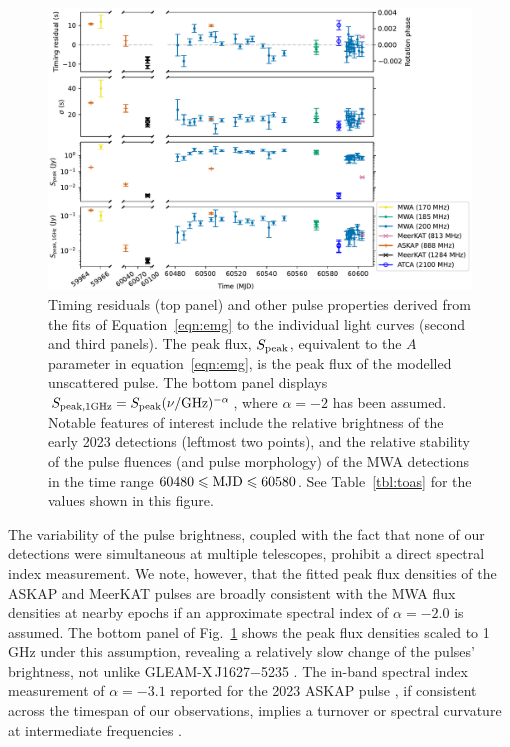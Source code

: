\documentclass[fleqn,usenatbib]{mnras}
\newcommand{\Fig}{Fig.}
\newcommand{\Tab}{Table}
\newcommand{\eqn}{equation}
\newcommand{\Eqn}{Equation}
\begin{document}
\begin{figure}
  \centering
  \includegraphics[width=0.98\linewidth]{pulse_details.pdf}
  \caption{Timing residuals (top panel) and other pulse properties derived from the fits of \Eqn~\ref{eqn:emg} to the individual light curves (second and third panels). The peak flux, $S_{\rm peak}$, equivalent to the $A$ parameter in \eqn~\ref{eqn:emg}, is the peak flux of the modelled unscattered pulse. The bottom panel displays $S_{\rm peak,1 GHz} = S_{\rm peak} (\nu/{\rm GHz})^{-\alpha}$, where $\alpha = -2$ has been assumed. Notable features of interest include the relative brightness of the early 2023 detections (leftmost two points), and the relative stability of the pulse fluences (and pulse morphology) of the MWA detections in the time range $60480 \le {\rm MJD} \le 60580$. See \Tab~\ref{tbl:toas} for the values shown in this figure.}
  \label{fig:pulse_details}
\end{figure}

The variability of the pulse brightness, coupled with the fact that none of our detections were simultaneous at multiple telescopes, prohibit a direct spectral index measurement.
We note, however, that the fitted peak flux densities of the ASKAP and MeerKAT pulses are broadly consistent with the MWA flux densities at nearby epochs if an approximate spectral index of $\alpha = -2.0$ is assumed.
The bottom panel of \Fig~\ref{fig:pulse_details} shows the peak flux densities scaled to 1\,GHz under this assumption, revealing a relatively slow change of the pulses' brightness, not unlike GLEAM-X\,J1627$-$5235 \citep{2022Natur.601..526H}.
The in-band spectral index measurement of $\alpha=-3.1$ reported for the 2023 ASKAP pulse , if consistent across the timespan of our observations, implies a turnover or spectral curvature at intermediate frequencies \citep[perhaps comparable with GPM\,1839$-$10;][]{2023Natur.619..487H}.
\end{document}
